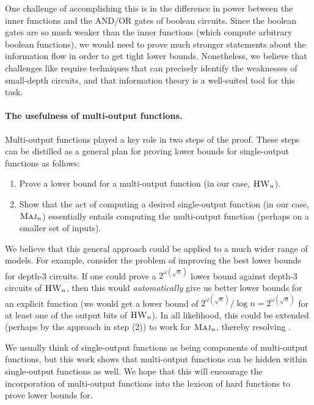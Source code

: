 \documentclass[10pt,a4paper]{article}
\theoremstyle{definition}
\theoremstyle{remark}
\newcommand{\mathsc}[1]{{\normalfont\textsc{#1}}}
\DeclareMathOperator{\Maj}{\mathsc{Maj}}
\DeclareMathOperator{\HW}{\mathsc{HW}}
\begin{document}
One challenge of accomplishing this is in the difference in power between the inner functions and the AND/OR gates of boolean circuits. Since the boolean gates are so much weaker than the inner functions (which compute arbitrary boolean functions), we would need to prove much stronger statements about the information flow in order to get tight lower bounds. Nonetheless, we believe that challenges like  require techniques that can precisely identify the weaknesses of small-depth circuits, and that information theory is a well-suited tool for this task.



\paragraph*{The usefulness of multi-output functions.} 
Multi-output functions played a key role in two steps of the proof. These steps can be distilled as a general plan for proving lower bounds for single-output functions as follows:

\begin{enumerate}[(1)]
    \item Prove a lower bound for a multi-output function (in our case, $\HW_n$). 
    \item Show that the act of computing a desired single-output function (in our case, $\Maj_n$) essentially entails computing the multi-output function (perhaps on a smaller set of inputs).
\end{enumerate}

We believe that this general approach could be applied to a much wider range of models. For example, consider the problem of improving the best lower bounds for depth-3 circuits. If one could prove a $2^{\omega(\sqrt{n})}$ lower bound against depth-3 circuits of $\HW_n$, then this would \emph{automatically} give us better lower bounds for an explicit function (we would get a lower bound of $2^{\omega(\sqrt{n})}/\log n = 2^{\omega(\sqrt{n})}$ for at least one of the output bits of $\HW_n$). In all likelihood, this could be extended (perhaps by the approach in step (2)) to work for $\Maj_n$, thereby resolving . 

We usually think of single-output functions as being components of multi-output functions, but this work shows that multi-output functions can be hidden within single-output functions as well. We hope that this will encourage the incorporation of multi-output functions into the lexicon of hard functions to prove lower bounds for. 
\end{document}
